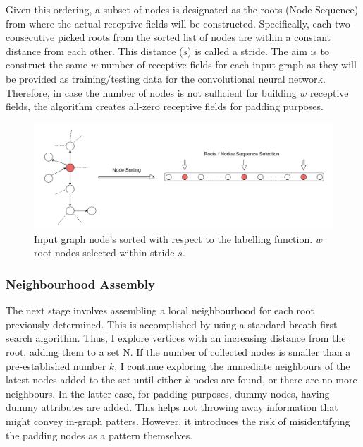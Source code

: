 Given this ordering, a subset of nodes is designated as the roots (Node Sequence) from where the actual receptive fields will be constructed. Specifically, each two consecutive picked roots from the sorted list of nodes are within a constant distance from each other. This distance ($s$) is called a stride. The aim is to construct the same $w$ number of receptive fields for each input graph as they will be provided as training/testing data for the convolutional neural network. Therefore, in case the number of nodes is not sufficient for building $w$ receptive fields, the algorithm creates all-zero receptive fields for padding purposes. \\

\begin{figure}[H]
  \centering
  \includegraphics[scale=0.4]{Images/nodeseqsel.png}
  \caption{Input graph node's sorted with respect to the labelling function. $w$ root nodes selected within stride $s$.}
  \label{nodeseqsel}
\end{figure}

\subsubsection*{Neighbourhood Assembly}

The next stage involves assembling a local neighbourhood for each root previously determined. This is accomplished by using a standard breath-first search algorithm. Thus, I explore vertices with an increasing distance from the root, adding them to a set N. If the number of collected nodes is smaller than a pre-established number $k$, I continue exploring the immediate neighbours of the latest nodes added to the set until either $k$ nodes are found, or there are no more neighbours. In the latter case, for padding purposes, dummy nodes, having dummy attributes are added. This helps not throwing away information that might convey in-graph patters. However, it introduces the risk of misidentifying the padding nodes as a pattern themselves. \\

